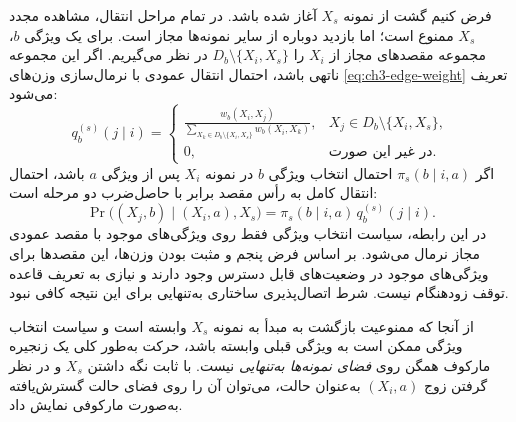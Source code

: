 فرض کنیم گشت از نمونه $X_s$ آغاز شده باشد. در تمام مراحل انتقال، مشاهده مجدد $X_s$ ممنوع است؛ اما بازدید دوباره از سایر نمونه‌ها مجاز است. برای یک ویژگی $b$، مجموعه مقصدهای مجاز از $X_i$ را $D_b\setminus\{X_i,X_s\}$ در نظر می‌گیریم. اگر این مجموعه ناتهی باشد، احتمال انتقال عمودی با نرمال‌سازی وزن‌های \eqref{eq:ch3-edge-weight} تعریف می‌شود:
\begin{equation}\label{eq:ch3-vertical-transition}
q_b^{(s)}(j\mid i)=
\begin{cases}
\displaystyle\frac{w_b(X_i,X_j)}
{\sum\limits_{X_k\in D_b\setminus\{X_i,X_s\}}w_b(X_i,X_k)},
& X_j\in D_b\setminus\{X_i,X_s\},\\[6pt]
0,&\text{در غیر این صورت}.
\end{cases}
\end{equation}
اگر $\pi_s(b\mid i,a)$ احتمال انتخاب ویژگی $b$ در نمونه $X_i$ پس از ویژگی $a$ باشد، احتمال انتقال کامل به رأس مقصد برابر با حاصل‌ضرب دو مرحله است:
\begin{equation}\label{eq:ch3-full-transition}
\Pr\bigl((X_j,b)\mid(X_i,a),X_s\bigr)
=\pi_s(b\mid i,a)\,q_b^{(s)}(j\mid i).
\end{equation}
در این رابطه، سیاست انتخاب ویژگی فقط روی ویژگی‌های موجود با مقصد عمودی مجاز نرمال می‌شود. بر اساس فرض پنجم و مثبت بودن وزن‌ها، این مقصدها برای ویژگی‌های موجود در وضعیت‌های قابل دسترس وجود دارند و نیازی به تعریف قاعده توقف زودهنگام نیست. شرط اتصال‌پذیری ساختاری به‌تنهایی برای این نتیجه کافی نبود.

از آنجا که ممنوعیت بازگشت به مبدأ به نمونه $X_s$ وابسته است و سیاست انتخاب ویژگی ممکن است به ویژگی قبلی وابسته باشد، حرکت به‌طور کلی یک زنجیره مارکوف همگن روی \emph{فضای نمونه‌ها به‌تنهایی} نیست. با ثابت نگه داشتن $X_s$ و در نظر گرفتن زوج $(X_i,a)$ به‌عنوان حالت، می‌توان آن را روی فضای حالت گسترش‌یافته به‌صورت مارکوفی نمایش داد.

